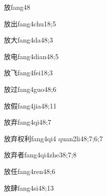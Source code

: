 \begin{verbete}{放}{fang4}{8}
\end{verbete}

\begin{verbete}{放出}{fang4chu1}{8;5}
\end{verbete}

\begin{verbete}{放大}{fang4da4}{8;3}
\end{verbete}

\begin{verbete}{放电}{fang4dian4}{8;5}
\end{verbete}

\begin{verbete}{放飞}{fang4fei1}{8;3}
\end{verbete}

\begin{verbete}{放过}{fang4guo4}{8;6}
\end{verbete}

\begin{verbete}{放假}{fang4jia4}{8;11}
\end{verbete}

\begin{verbete}{放弃}{fang4qi4}{8;7}
\end{verbete}

\begin{verbete}{放弃权利}{fang4qi4 quan2li4}{8;7;6;7}
\end{verbete}

\begin{verbete}{放弃者}{fang4qi4zhe3}{8;7;8}
\end{verbete}

\begin{verbete}{放任}{fang4ren4}{8;6}
\end{verbete}

\begin{verbete}{放肆}{fang4si4}{8;13}
\end{verbete}

